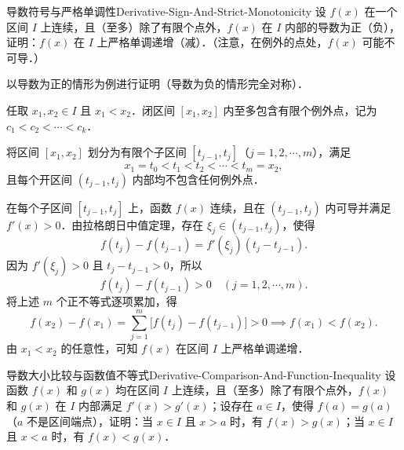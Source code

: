 \begin{problem}{导数符号与严格单调性}{Derivative-Sign-And-Strict-Monotonicity}
    设 $f(x)$ 在一个区间 $I$ 上连续，且（至多）除了有限个点外，$f(x)$ 在 $I$ 内部的导数为正（负），证明：$f(x)$ 在 $I$ 上严格单调递增（减）．（注意，在例外的点处，$f(x)$ 可能不可导．）
\end{problem}

\begin{myproof}
    以导数为正的情形为例进行证明（导数为负的情形完全对称）．

    任取 $x_1, x_2 \in I$ 且 $x_1 < x_2$．闭区间 $[x_1, x_2]$ 内至多包含有限个例外点，记为 $c_1 < c_2 < \cdots < c_k$．

    将区间 $[x_1, x_2]$ 划分为有限个子区间 $[t_{j-1}, t_j]$（$j = 1, 2, \cdots, m$），满足
    \begin{equation}
        x_1 = t_0 < t_1 < t_2 < \cdots < t_m = x_2,
    \end{equation}
    且每个开区间 $(t_{j-1}, t_j)$ 内部均不包含任何例外点．

    在每个子区间 $[t_{j-1}, t_j]$ 上，函数 $f(x)$ 连续，且在 $(t_{j-1}, t_j)$ 内可导并满足 $f'(x) > 0$．由拉格朗日中值定理，存在 $\xi_j \in (t_{j-1}, t_j)$，使得
    \begin{equation}
        f(t_j) - f(t_{j-1}) = f'(\xi_j)(t_j - t_{j-1}).
    \end{equation}
    因为 $f'(\xi_j) > 0$ 且 $t_j - t_{j-1} > 0$，所以
    \begin{equation}
        f(t_j) - f(t_{j-1}) > 0 \quad (j = 1, 2, \cdots, m).
    \end{equation}
    将上述 $m$ 个正不等式逐项累加，得
    \begin{equation}
        f(x_2) - f(x_1) = \sum_{j=1}^m \bigl[ f(t_j) - f(t_{j-1}) \bigr] > 0 \implies f(x_1) < f(x_2).
    \end{equation}
    由 $x_1 < x_2$ 的任意性，可知 $f(x)$ 在区间 $I$ 上严格单调递增．
\end{myproof}

\begin{problem}{导数大小比较与函数值不等式}{Derivative-Comparison-And-Function-Inequality}
    设函数 $f(x)$ 和 $g(x)$ 均在区间 $I$ 上连续，且（至多）除了有限个点外，$f(x)$ 和 $g(x)$ 在 $I$ 内部满足 $f'(x) > g'(x)$；设存在 $a \in I$，使得 $f(a) = g(a)$（$a$ 不是区间端点），证明：当 $x \in I$ 且 $x > a$ 时，有 $f(x) > g(x)$；当 $x \in I$ 且 $x < a$ 时，有 $f(x) < g(x)$．
\end{problem}

